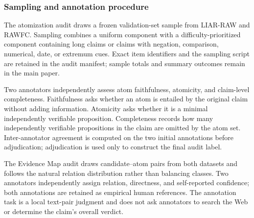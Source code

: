 \subsubsection{Sampling and annotation procedure}

The atomization audit draws a frozen validation-set sample from LIAR-RAW and
RAWFC.  Sampling combines a uniform component with a
difficulty-prioritized component containing long claims or claims with
negation, comparison, numerical, date, or extremum cues.  Exact item
identifiers and the sampling script are retained in the audit manifest;
sample totals and summary outcomes remain in the main paper.

Two annotators independently assess atom faithfulness, atomicity, and
claim-level completeness.  Faithfulness asks whether an atom is entailed by
the original claim without adding information.  Atomicity asks whether it
is a minimal independently verifiable proposition.  Completeness records
how many independently verifiable propositions in the claim are omitted by
the atom set.  Inter-annotator agreement is computed on the two initial
annotations before adjudication; adjudication is used only to construct the
final audit label.

The Evidence Map audit draws candidate--atom pairs from both datasets and
follows the natural relation distribution rather than balancing classes.
Two annotators independently assign relation, directness, and self-reported
confidence; both annotations are retained as empirical human references.
The annotation task is a local text-pair judgment and does not ask
annotators to search the Web or determine the claim's overall verdict.






